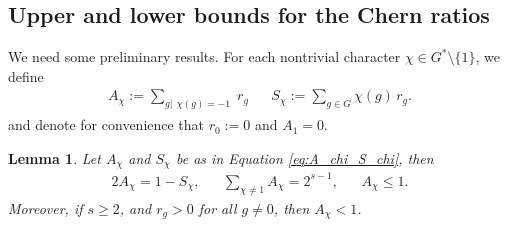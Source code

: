 \documentclass[12pt,twoside,]{amsart}
\theoremstyle{plain}
\newtheorem{lemma}[theorem]{Lemma}
\theoremstyle{definition}
\begin{document}
\subsection{Upper and lower bounds for the Chern ratios}
We need some preliminary results. For each nontrivial character $\chi \in G^* \setminus\{1\}$, we define
\begin{align}\label{eq:A_chi_S_chi}
A_\chi := \sum_{g | \substack{ \chi(g) = -1}} r_g
&&
S_\chi := \sum_{g \in G} \chi(g)\, r_g.
\end{align}
and denote for convenience that $r_0 := 0$ and 
$A_1 = 0$.
\begin{lemma}\label{lemma:A_chi}
Let $A_\chi$ and $S_\chi$ be as in Equation \eqref{eq:A_chi_S_chi}, then  
\begin{align*}
2A_\chi = 1 - S_\chi,
&&
\sum_{\chi \neq 1} A_\chi = 2^{s-1},
&&
A_\chi \leq 1.
\end{align*}
Moreover, if $s \geq 2$, and $r_g > 0$ for all $g \neq 0$, then  $A_{\chi} < 1$.
\end{lemma}
\end{document}
